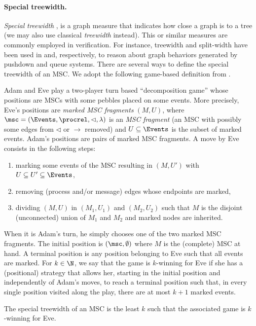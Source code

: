 \paragraph*{Special treewidth.}

\emph{Special treewidth} \cite{Courcelle10},
is a graph measure that indicates how close
a graph is to a tree (we may also use classical
	\emph{treewidth} instead).
This or similar measures are commonly employed in verification. For instance, treewidth and split-width have been used in \cite{MadhusudanP11} and, respectively, \cite{DBLP:conf/concur/CyriacGK12,AiswaryaGK14} to reason about graph behaviors generated by pushdown and queue systems.
There are several ways to define the special treewidth of an MSC.
We adopt the following game-based definition from \cite{DBLP:journals/corr/abs-1904-06942}.

Adam and Eve play a two-player turn based ``decomposition game''
whose positions
are MSCs with some pebbles placed on some events.
More precisely, Eve's positions are
\emph{marked MSC fragments} $(M, U)$, where
$\msc = (\Events, \procrel, \lhd, \lambda)$
is an \emph{MSC fragment} (an MSC with possibly some edges from
$\lhd$ or $\to$ removed)
 and $U \subseteq \Events$ is the subset of marked events.
Adam's positions are pairs of marked MSC fragments.
A move by Eve consists in the following steps:
\begin{enumerate}
	\item marking some events of the MSC resulting in $(M, U')$ with $U \subseteq U' \subseteq \Events$,
	\item removing (process and/or message) edges whose endpoints are marked,
	\item dividing $(M, U)$ in $(M_1, U_1)$ and $(M_2, U_2)$ such that $M$ is the disjoint (unconnected) union of $M_1$ and $M_2$
	and marked nodes are inherited.
\end{enumerate}
When it is Adam's turn, he simply chooses one of the two marked MSC fragments.
The initial position is $(\msc,\emptyset)$ where $M$ is the (complete) MSC at hand. A terminal position is any position belonging to Eve such that all events are marked.
%
For $k \in \N$, we say that the game is $k$-winning for Eve if she has a (positional) strategy that allows her,
starting in the initial position and independently of Adam's moves, to reach a terminal position such that, in every single position visited along the play, there are at most $k+1$ marked events.

\begin{fact}
	The special treewidth of an MSC is the least $k$ such that
	the associated game is $k$-winning for Eve.
\end{fact}

